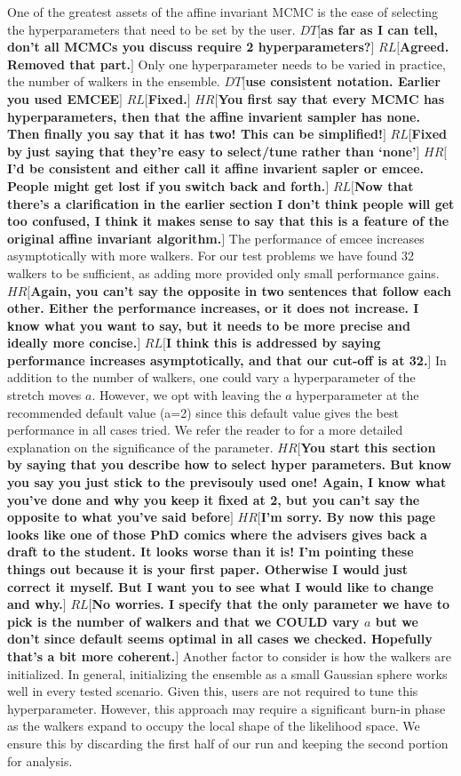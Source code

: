 \documentclass{aa}
\def\memohr#1{\color{blue}$HR[${\bf #1}$]$ \color{black}}
\def\memodt#1{\color{green}$DT[${\bf #1}$]$ \color{black}}
\def\memorl#1{\color{gray}$RL[${\bf #1}$]$ \color{black}}
\begin{document}
One of the greatest assets of the affine invariant MCMC is the ease of selecting the hyperparameters that need to be set by the user. \memodt{as far as I can tell, don't all MCMCs you discuss require 2 hyperparameters?} \memorl{Agreed. Removed that part.}
Only one hyperparameter needs to be varied in practice, the number of walkers in the ensemble.
\memodt{use consistent notation. Earlier you used EMCEE} \memorl{Fixed.}
\memohr{You first say that every MCMC has hyperparameters, then that the affine invarient sampler has none. Then finally you say that it has two! This can be simplified!} \memorl{Fixed by just saying that they're easy to select/tune rather than `none'}
\memohr{I'd be consistent and either call it affine invarient sapler or emcee. People might get lost if you switch back and forth.}
\memorl{Now that there's a clarification in the earlier section I don't think people will get too confused, I think it makes sense to say that this is a feature of the original affine invariant algorithm.}
The performance of emcee increases asymptotically with more walkers.
For our test problems we have found 32 walkers to be sufficient, as adding more provided only small performance gains. 
\memohr{Again, you can't say the opposite in two sentences that follow each other. Either the performance increases, or it does not increase. I know what you want to say, but it needs to be more precise and ideally more concise.}
\memorl{I think this is addressed by saying performance increases asymptotically, and that our cut-off is at 32.}
In addition to the number of walkers, one could vary a hyperparameter of the stretch moves $a$. 
However, we opt with leaving the $a$ hyperparameter at the recommended default value (a=2) since this default value gives the best performance in all cases tried.
We refer the reader to \cite{Foreman-Mackey2013} for a more detailed explanation on the significance of the parameter. 
\memohr{You start this section by saying that you describe how to select hyper parameters. But know you say you just stick to the previsouly used one! Again, I know what you've done and why you keep it fixed at 2, but you can't say the opposite to what you've said before}
\memohr{I'm sorry. By now this page looks like one of those PhD comics where the advisers gives back a draft to the student. It looks worse than it is! I'm pointing these things out because it is your first paper. Otherwise I would just correct it myself. But I want you to see what I would like to change and why.} \memorl{No worries. I specify that the only parameter we have to pick is the number of walkers and that we COULD vary $a$ but we don't since default seems optimal in all cases we checked. Hopefully that's a bit more coherent.}
Another factor to consider is how the walkers are initialized. In general, initializing the ensemble as a small Gaussian sphere works well in every tested scenario.
Given this, users are not required to tune this hyperparameter.
However, this approach may require a significant burn-in phase as the walkers expand to occupy the local shape of the likelihood space.
We ensure this by discarding the first half of our run and keeping the second portion for analysis.
\end{document}
